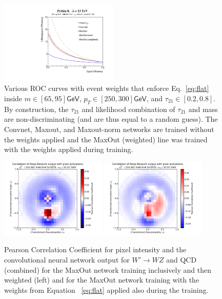 \begin{figure}[htbp]
  \centering
    \includegraphics[width=0.5\textwidth]{figures/ROCs_window.pdf}
  \caption{Various ROC curves with event weights that enforce Eq.~\ref{eq:flat} inside $m\in[65, 95]\mathsf{GeV}$,  $p_T\in[250, 300]\mathsf{GeV}$, and  $\tau_{21}\in[0.2, 0.8]$.  By construction, the $\tau_{21}$ and likelihood combination of $\tau_{21}$ and mass are non-discriminating (and are thus equal to a random guess).  The Convnet, Maxout, and Maxout-norm networks are trained without the weights applied and the MaxOut (weighted) line was trained with the weights applied during training.}
  \label{fig:rocCube}
\end{figure}


\begin{figure}[htbp]
  \centering
  \includegraphics[width=0.45\textwidth]{figures/hypercube-pixel-activations-corr.pdf} \includegraphics[width=0.45\textwidth]{figures/ahypercube-pixel-activations-corr.pdf}
  \caption{Pearson Correlation Coefficient for pixel intensity and the convolutional neural network output for $W'\rightarrow WZ$ and QCD (combined) for the MaxOut network training inclusively and then weighted (left) and for the MaxOut network training with the weights from Equation ~\ref{eq:flat} applied also during the training.}
  \label{fig:cor_hyper}
\end{figure}

